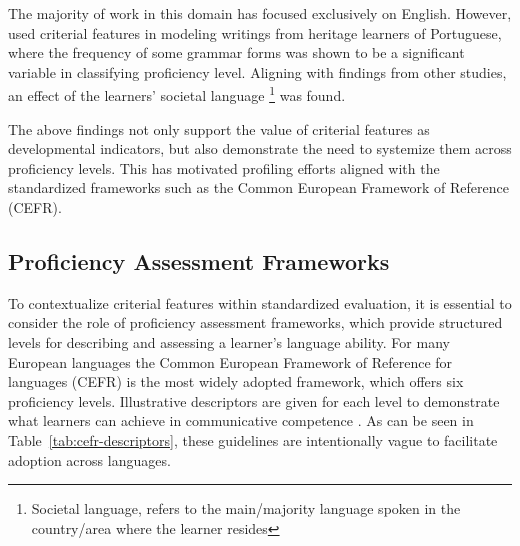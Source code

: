 The majority of work in this domain has focused exclusively on English. However, \citet{akef2025} used criterial
features in modeling writings from heritage learners of Portuguese,  where the frequency of some grammar forms
was shown
to be a significant variable in classifying proficiency level. Aligning with findings from other studies, an effect
of the learners' societal language
\footnote{Societal language, refers to the main/majority language spoken in the country/area where the learner resides}
was found.

The above findings not only support the value of criterial features as developmental indicators, but also
demonstrate the need to systemize them across proficiency levels. This has motivated profiling efforts \cite{Saville2010}
aligned
with
the standardized frameworks such as the Common European Framework of Reference (CEFR).



\subsection{Proficiency Assessment Frameworks}



To contextualize criterial features within standardized evaluation, it is essential to consider the role of
proficiency assessment frameworks, which provide structured levels for describing and assessing a learner's language
ability. For many European languages the Common European Framework of Reference for languages (CEFR) is the most
widely adopted framework, which offers six proficiency levels. Illustrative
descriptors are given for each level to demonstrate what learners can achieve in communicative
competence \citep{CEFR2020}. As can be seen in Table~\ref{tab:cefr-descriptors}, these guidelines are intentionally
vague to facilitate
adoption
across
languages.

